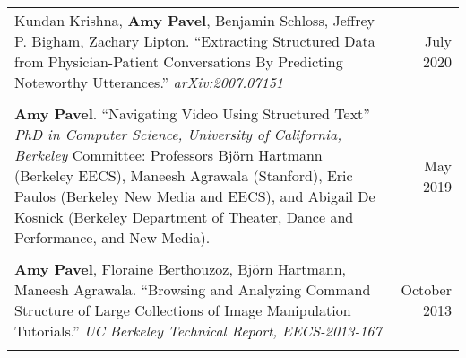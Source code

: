\begin{longtable}{Xr}
	Kundan Krishna, \textbf{Amy Pavel}, Benjamin Schloss, Jeffrey P. Bigham, Zachary Lipton. ``Extracting Structured Data from Physician-Patient Conversations By Predicting Noteworthy Utterances.'' \textit{arXiv:2007.07151} & July 2020 \\
	\\

	\textbf{Amy Pavel}. ``Navigating Video Using Structured Text'' \textit{PhD in Computer Science, University of California, Berkeley} Committee: Professors Björn Hartmann (Berkeley EECS), Maneesh Agrawala (Stanford), Eric Paulos (Berkeley New Media and EECS), and Abigail De Kosnick (Berkeley Department of Theater, Dance and Performance, and New Media). & May 2019 \\
	\\

	\textbf{Amy Pavel}, Floraine Berthouzoz, Björn Hartmann, Maneesh Agrawala. ``Browsing and Analyzing Command Structure of Large Collections of Image Manipulation Tutorials.'' \textit{UC Berkeley Technical Report, EECS-2013-167} & October 2013 \\
	\\

\end{longtable}